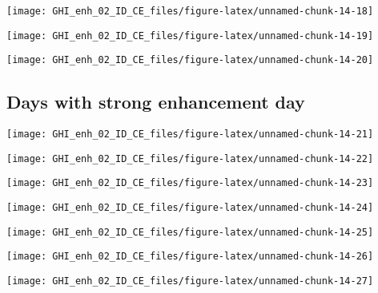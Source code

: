\documentclass[
  10pt,
  a4paper,oneside]{article}
\begin{document}
\begin{center}\texttt{[image: GHI\_enh\_02\_ID\_CE\_files/figure-latex/unnamed-chunk-14-18]} \end{center}

\begin{center}\texttt{[image: GHI\_enh\_02\_ID\_CE\_files/figure-latex/unnamed-chunk-14-19]} \end{center}

\begin{center}\texttt{[image: GHI\_enh\_02\_ID\_CE\_files/figure-latex/unnamed-chunk-14-20]} \end{center}

\FloatBarrier

\hypertarget{days-with-strong-enhancement-day}{%
\subsection{Days with strong enhancement day}\label{days-with-strong-enhancement-day}}

\begin{center}\texttt{[image: GHI\_enh\_02\_ID\_CE\_files/figure-latex/unnamed-chunk-14-21]} \end{center}

\begin{center}\texttt{[image: GHI\_enh\_02\_ID\_CE\_files/figure-latex/unnamed-chunk-14-22]} \end{center}

\begin{center}\texttt{[image: GHI\_enh\_02\_ID\_CE\_files/figure-latex/unnamed-chunk-14-23]} \end{center}

\begin{center}\texttt{[image: GHI\_enh\_02\_ID\_CE\_files/figure-latex/unnamed-chunk-14-24]} \end{center}

\begin{center}\texttt{[image: GHI\_enh\_02\_ID\_CE\_files/figure-latex/unnamed-chunk-14-25]} \end{center}

\begin{center}\texttt{[image: GHI\_enh\_02\_ID\_CE\_files/figure-latex/unnamed-chunk-14-26]} \end{center}

\begin{center}\texttt{[image: GHI\_enh\_02\_ID\_CE\_files/figure-latex/unnamed-chunk-14-27]} \end{center}
\end{document}
